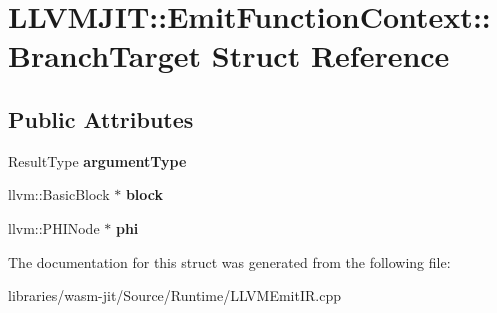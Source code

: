 \hypertarget{struct_l_l_v_m_j_i_t_1_1_emit_function_context_1_1_branch_target}{}\section{L\+L\+V\+M\+J\+IT\+:\+:Emit\+Function\+Context\+:\+:Branch\+Target Struct Reference}
\label{struct_l_l_v_m_j_i_t_1_1_emit_function_context_1_1_branch_target}
\subsection*{Public Attributes}
\begin{DoxyCompactItemize}
\item 
\mbox{\label{struct_l_l_v_m_j_i_t_1_1_emit_function_context_1_1_branch_target_a8595a9809e897f056a3aa48a03d69878}} 
Result\+Type {\bfseries argument\+Type}
\item 
\mbox{\label{struct_l_l_v_m_j_i_t_1_1_emit_function_context_1_1_branch_target_a84b57f9eb6d46733003c57a40f857d63}} 
llvm\+::\+Basic\+Block $\ast$ {\bfseries block}
\item 
\mbox{\label{struct_l_l_v_m_j_i_t_1_1_emit_function_context_1_1_branch_target_a8f0596dd9106e2835f1c39885386657d}} 
llvm\+::\+P\+H\+I\+Node $\ast$ {\bfseries phi}
\end{DoxyCompactItemize}


The documentation for this struct was generated from the following file\+:\begin{DoxyCompactItemize}
\item 
libraries/wasm-\/jit/\+Source/\+Runtime/L\+L\+V\+M\+Emit\+I\+R.\+cpp\end{DoxyCompactItemize}
